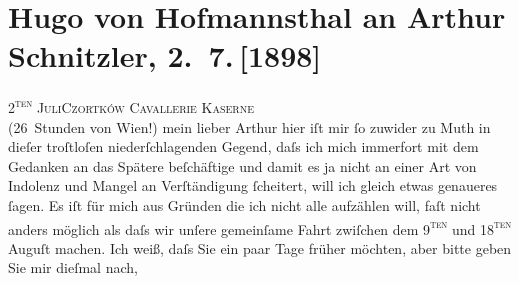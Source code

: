 

         
         \renewcommand{\erwaehntePersonen}{Personen: Hugo von Hofmannsthal}
         \renewcommand{\erwaehnteOrte}{Orte: Basel, Innsbruck, Maloja, Schweiz, Tschortkiw, Wien}
         \renewcommand{\erwaehnteWerke}{}
               \section[Hugo von Hofmannsthal an Arthur Schnitzler, 2. 7. {[}1898{]}]{ Hugo von Hofmannsthal an Arthur Schnitzler, 2. 7. {[}1898{]}}\nopagebreak{}\rehead{ }\begin{ledgroupsized}[t]{13cm}\normalsize\beginnumbering{} \toendnotes[C]{\smallbreak\pagebreak[2]} 
\pstart
           {\pb}\textsc{2\textsuperscript{ten} Juli}\hfill \textsc{Czortków}\pend
           \pstart
           \raggedleft{}\textsc{Cavallerie Kaserne}{\\} (26 Stunden von Wien!)\pend
           \pstart{}mein lieber Arthur\pend\pstart
           hier iſt mir ſo zuwider zu Muth in dieſer troſtloſen niederſchlagenden Gegend, daſs
               ich mich immerfort mit dem Gedanken an das Spätere beſchäftige und damit es ja nicht
               an einer Art von Indolenz und Mangel an Verſtändigung ſcheitert, will ich gleich
               etwas genaueres ſagen. Es iſt {\pb}für
               mich aus Gründen die ich nicht alle aufzählen will, faſt nicht anders möglich als
               daſs wir unſere gemeinſame Fahrt zwiſchen dem 9\textsc{\textsuperscript{ten}} und 18\textsc{\textsuperscript{ten}} Auguſt machen. Ich weiß, daſs Sie ein paar Tage früher möchten, aber
               bitte geben Sie mir dieſmal {\pb}nach,

\end{ledgroupsized}

